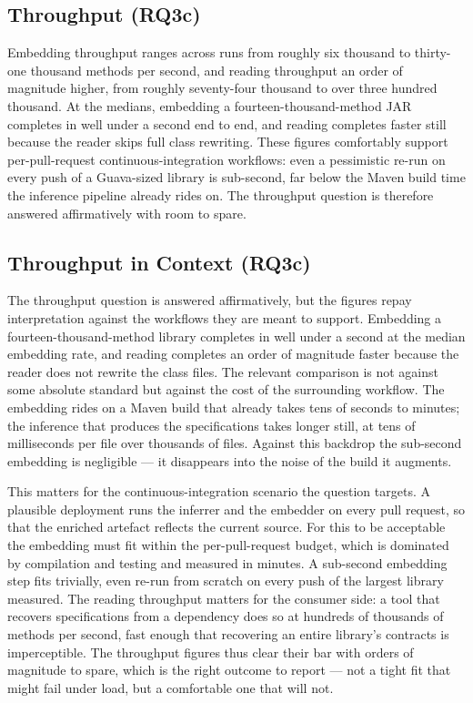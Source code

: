 \subsection{Throughput (RQ3c)}

Embedding throughput ranges across runs from roughly six thousand to thirty-one
thousand methods per second, and reading throughput an order of magnitude higher,
from roughly seventy-four thousand to over three hundred thousand. At the
medians, embedding a fourteen-thousand-method JAR completes in well under a
second end to end, and reading completes faster still because the reader skips
full class rewriting. These figures comfortably support per-pull-request
continuous-integration workflows: even a pessimistic re-run on every push of a
Guava-sized library is sub-second, far below the Maven build time the inference
pipeline already rides on. The throughput question is therefore answered
affirmatively with room to spare.

\subsection{Throughput in Context (RQ3c)}

The throughput question is answered affirmatively, but the figures repay
interpretation against the workflows they are meant to support. Embedding a
fourteen-thousand-method library completes in well under a second at the median
embedding rate, and reading completes an order of magnitude faster because the
reader does not rewrite the class files. The relevant comparison is not against
some absolute standard but against the cost of the surrounding workflow. The
embedding rides on a Maven build that already takes tens of seconds to minutes;
the inference that produces the specifications takes longer still, at tens of
milliseconds per file over thousands of files. Against this backdrop the sub-second
embedding is negligible --- it disappears into the noise of the build it
augments.

This matters for the continuous-integration scenario the question targets. A
plausible deployment runs the inferrer and the embedder on every pull request, so
that the enriched artefact reflects the current source. For this to be acceptable
the embedding must fit within the per-pull-request budget, which is dominated by
compilation and testing and measured in minutes. A sub-second embedding step fits
trivially, even re-run from scratch on every push of the largest library measured.
The reading throughput matters for the consumer side: a tool that recovers
specifications from a dependency does so at hundreds of thousands of methods per
second, fast enough that recovering an entire library's contracts is imperceptible.
The throughput figures thus clear their bar with orders of magnitude to spare,
which is the right outcome to report --- not a tight fit that might fail under
load, but a comfortable one that will not.

